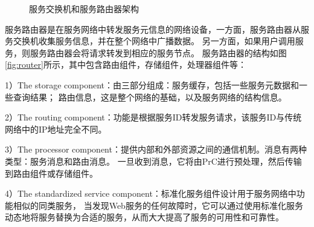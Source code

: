   \begin{figure}[htbp]
    \caption{服务交换机和服务路由器架构}
    \label{fig:loss}
    \end{figure}


    服务路由器是在服务网络中转发服务元信息的网络设备，一方面，服务路由器从服务交换机收集服务信息，并在整个网络中广播数据。 
    另一方面，如果用户调用服务，则服务路由器会将请求转发到相应的服务节点。 
    服务路由器的结构如图\ref{fig:router}所示，其中包含路由组件，存储组件，处理器组件等：

    1）The storage component：由三部分组成：服务缓存，包括一些服务元数据和一些查询结果；
    路由信息，这是整个网络的基础，以及服务网络的结构信息。
    
    2）The routing component：功能是根据服务ID转发服务请求，该服务ID与传统网络中的IP地址完全不同。
    
    3）The processor component：提供内部和外部资源之间的通信机制。消息有两种类型：服务消息和路由消息。
    一旦收到消息，它将由PrC进行预处理，然后传输到路由组件或存储组件。
    
    4）The standardized service component：标准化服务组件设计用于服务网络中功能相似的同类服务，
    当发现Web服务的任何故障时，它可以通过使用标准化服务动态地将服务替换为合适的服务，从而大大提高了服务的可用性和可靠性。


